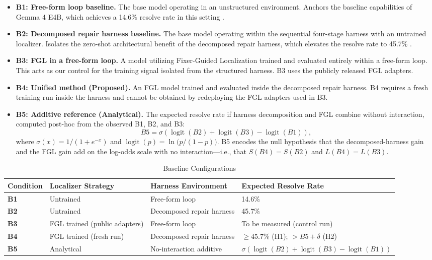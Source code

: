 \documentclass[11pt,a4paper]{article}
\begin{document}
\begin{itemize}[leftmargin=*, topsep=4pt, itemsep=3pt]
    \item \textbf{B1: Free-form loop baseline.} The base model operating in an unstructured environment. Anchors the baseline capabilities of Gemma 4 E4B, which achieves a 14.6\% resolve rate in this setting \cite{LOOP}.
    \item \textbf{B2: Decomposed repair harness baseline.} The base model operating within the sequential four-stage harness with an untrained localizer. Isolates the zero-shot architectural benefit of the decomposed repair harness, which elevates the resolve rate to 45.7\% \cite{LOOP}.
    \item \textbf{B3: FGL in a free-form loop.} A model utilizing Fixer-Guided Localization trained and evaluated entirely within a free-form loop. This acts as our control for the training signal isolated from the structured harness. B3 uses the publicly released FGL adapters.
    \item \textbf{B4: Unified method (Proposed).} An FGL model trained and evaluated inside the decomposed repair harness. B4 requires a fresh training run inside the harness and cannot be obtained by redeploying the FGL adapters used in B3.
    \item \textbf{B5: Additive reference (Analytical).} The expected resolve rate if harness decomposition and FGL combine without interaction, computed post-hoc from the observed B1, B2, and B3:
    \[
        B5 = \sigma\!\left(\operatorname{logit}(B2) + \operatorname{logit}(B3) - \operatorname{logit}(B1)\right),
    \]
    where $\sigma(x) = 1/(1+e^{-x})$ and $\operatorname{logit}(p) = \ln\!\big(p/(1-p)\big)$. B5 encodes the null hypothesis that the decomposed-harness gain and the FGL gain add on the log-odds scale with no interaction---i.e., that $S(B4) = S(B2)$ and $L(B4) = L(B3)$.
\end{itemize}

\begin{table}[H]
\centering
\caption{Baseline Configurations}
\label{tab:baselines}
\vspace{4pt}
\begin{tabularx}{\textwidth}{l l l Y}
\toprule
\textbf{Condition} & \textbf{Localizer Strategy} & \textbf{Harness Environment} & \textbf{Expected Resolve Rate} \\
\midrule
\textbf{B1} & Untrained & Free-form loop & 14.6\% \cite{LOOP} \\
\textbf{B2} & Untrained & Decomposed repair harness & 45.7\% \cite{LOOP} \\
\textbf{B3} & FGL trained (public adapters) & Free-form loop & To be measured (control run) \\
\textbf{B4} & FGL trained (fresh run) & Decomposed repair harness & $\ge 45.7\%$ (H1); $> B5 + \delta$ (H2) \\
\textbf{B5} & Analytical & No-interaction additive & {\small $\sigma(\operatorname{logit}(B2)+\operatorname{logit}(B3)-\operatorname{logit}(B1))$} \\
\bottomrule
\end{tabularx}
\end{table}
\end{document}
